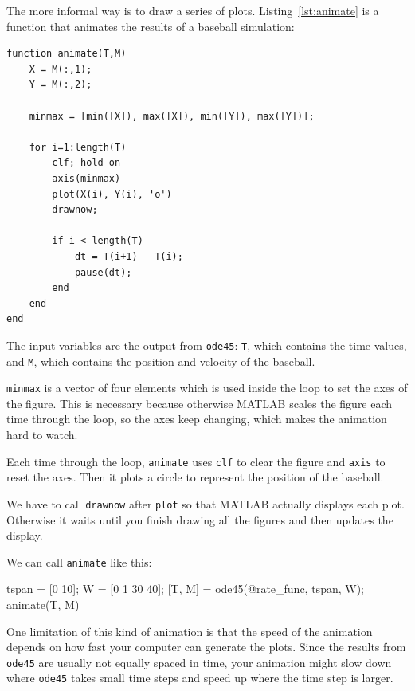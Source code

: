 
The more informal way is to draw a series of plots.  Listing~\ref{lst:animate} is a function that animates the results of a baseball simulation:

\begin{lstlisting}[caption={A function that animates the results of a baseball simulation}, label={lst:animate}]
function animate(T,M)
    X = M(:,1);
    Y = M(:,2);

    minmax = [min([X]), max([X]), min([Y]), max([Y])];

    for i=1:length(T)
        clf; hold on
        axis(minmax)
        plot(X(i), Y(i), 'o')
        drawnow;
        
        if i < length(T)
            dt = T(i+1) - T(i);
            pause(dt);
        end
    end
end
\end{lstlisting}

The input variables are the output from \lstinline{ode45}: \lstinline{T}, which contains the time values, and \lstinline{M}, which contains the position and velocity of the baseball.


\lstinline{minmax} is a vector of four elements which is used inside the loop to set the axes of the figure.  
This is necessary because otherwise MATLAB scales the figure each time through the loop,
so the axes keep changing, which makes the animation hard to watch.


Each time through the loop, \lstinline{animate} uses \lstinline{clf}
to clear the figure and \lstinline{axis} to reset the axes.  Then it plots a circle to represent the position of the baseball.


We have to call \lstinline{drawnow} after \lstinline{plot} so
that MATLAB actually displays each plot.  Otherwise it waits
until you finish drawing all the figures and then updates
the display.

We can call \lstinline{animate} like this:

\begin{code}
    tspan = [0 10];
    W = [0 1 30 40];
    [T, M] = ode45(@rate_func, tspan, W);
    animate(T, M)
\end{code}

One limitation of this kind of animation is that the speed
of the animation depends on how fast your computer can generate
the plots.  Since the results from \lstinline{ode45} are usually not
equally spaced in time, your animation might slow down where
\lstinline{ode45} takes small time steps and speed up where the time
step is larger.

